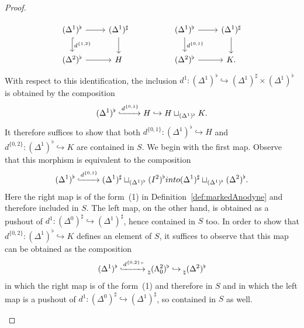 \documentclass[reqno]{amsart}
\numberwithin{equation}{subsection}
\theoremstyle{plain}
\theoremstyle{definition}
\let\into=\hookrightarrow
\begin{document}
\begin{proof}
\begin{enumerate}
		\begin{equation*}
		\begin{tikzcd}
		(\Delta^1)^\flat\arrow[r]\arrow[d, hookrightarrow, "d^{\{1,2\}}"] & (\Delta^1)^\sharp\arrow[d] && (\Delta^1)^\flat\arrow[r] \arrow[d, "d^{\{0,1\}}"]& (\Delta^1)^\sharp\arrow[d]\\
		(\Delta^2)^\flat\arrow[r] & H && (\Delta^2)^\flat\arrow[r] & K.
		\end{tikzcd}
		\end{equation*}
		With respect to this identification, the inclusion $d^1\colon (\Delta^1)^\flat\into(\Delta^1)^\sharp\times(\Delta^1)^\flat$ is obtained by the composition
		\begin{equation*}
		(\Delta^1)^\flat\xhookrightarrow{d^{\{0,1\}}} H\into H\sqcup_{(\Delta^1)^\flat} K.
		\end{equation*}
		It therefore suffices to show that both $d^{\{0,1\}}\colon (\Delta^1)^\flat\into H$ and $d^{\{0,2\}}\colon (\Delta^1)^\flat\into K$ are contained in $S$. We begin with the first map. Observe that this morphism is equivalent to the composition
		\begin{equation*}
		(\Delta^1)^\flat \xhookrightarrow{d^{\{0,1\}}} (\Delta^1)^\sharp\sqcup_{(\Delta^1)^\flat}(I^2)^\flat\\into (\Delta^1)^\sharp\sqcup_{(\Delta^1)^\flat}(\Delta^2)^\flat.
		\end{equation*}
		Here the right map is of the form~(1) in Definition~\ref{def:markedAnodyne} and therefore included in $S$. The left map, on the other hand, is obtained as a pushout of $d^1\colon( \Delta^0)^\sharp\into (\Delta^1)^\sharp$, hence contained in $S$ too. In order to show that $d^{\{0,2\}}\colon (\Delta^1)^\flat\into K$ defines an element of $S$, it suffices to observe that this map can be obtained as the composition
		\begin{equation*}
		(\Delta^1)^\flat\xhookrightarrow{d^{\{0,2\}}"} \prescript{}{\natural}(\Lambda^2_0)^\flat\into \prescript{}{\natural}(\Delta^2)^\flat
		\end{equation*}
		in which the right map is of the form~(1) and therefore in $S$ and in which the left map is a pushout of $d^1\colon (\Delta^0)^\sharp\into (\Delta^1)^\sharp$, so contained in $S$ as well.
		

\end{enumerate}
\end{proof}
\end{document}
